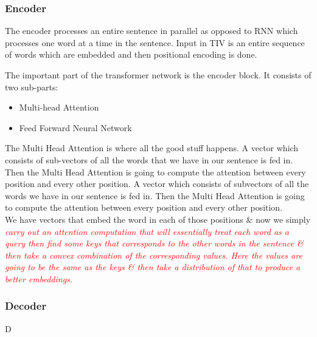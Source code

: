 \documentclass{article}
\begin{document}
\subsubsection{Encoder}
The encoder processes an entire sentence in parallel as opposed to RNN which processes one word at a time in the sentence. Input in TIV is an entire sequence of words which are embedded and then positional encoding is done.
\begin{minipage}{0.6\textwidth}

\end{minipage}
\begin{minipage}{0.5\textwidth}
The important part of the transformer network is the encoder block. It consists of two sub-parts:
\begin{itemize}
    \item Multi-head Attention
    \item Feed Forward Neural Network
\end{itemize}
\end{minipage}
The Multi Head Attention is where all the good stuff happens. A vector which consists of sub-vectors of all the words that we have in our sentence is fed in.  Then the Multi Head Attention is going to compute the attention between every position and every other position. A vector which consists of subvectors of all the words we have in our sentence is fed in. Then the Multi Head Attention is going to compute the attention between every position and every other position. \\
We have vectors that embed the word in each of those positions \& now we simply \textit{  \textcolor{red}{  carry out an attention computation that will essentially treat each word as a query then find some keys that corresponds to the other words in the sentence \& then take a convex combination of the corresponding values. Here the values are going to be the same as the keys \& then take a distribution of that to produce a better embeddings.}} 

\subsubsection{Decoder}
D
\end{document}
